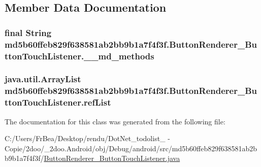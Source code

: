 \subsection{Member Data Documentation}
\hypertarget{classmd5b60ffeb829f638581ab2bb9b1a7f4f3f_1_1_button_renderer___button_touch_listener_fd5f3e04e3609dcb075193a11013bec6}{
\subsubsection[{\_\-\_\-md\_\-methods}]{\setlength{\rightskip}{0pt plus 5cm}final String {\bf md5b60ffeb829f638581ab2bb9b1a7f4f3f.ButtonRenderer\_\-ButtonTouchListener.\_\-\_\-md\_\-methods}}}
\label{classmd5b60ffeb829f638581ab2bb9b1a7f4f3f_1_1_button_renderer___button_touch_listener_fd5f3e04e3609dcb075193a11013bec6}


\hypertarget{classmd5b60ffeb829f638581ab2bb9b1a7f4f3f_1_1_button_renderer___button_touch_listener_84ecbd0189aa8fa49c03393cf6f9be5a}{
\subsubsection[{refList}]{\setlength{\rightskip}{0pt plus 5cm}java.util.ArrayList {\bf md5b60ffeb829f638581ab2bb9b1a7f4f3f.ButtonRenderer\_\-ButtonTouchListener.refList}}}
\label{classmd5b60ffeb829f638581ab2bb9b1a7f4f3f_1_1_button_renderer___button_touch_listener_84ecbd0189aa8fa49c03393cf6f9be5a}




The documentation for this class was generated from the following file:\begin{CompactItemize}
\item 
C:/Users/FrBea/Desktop/rendu/DotNet\_\-todolist\_ - Copie/2doo/\_\-2doo.Android/obj/Debug/android/src/md5b60ffeb829f638581ab2bb9b1a7f4f3f/\hyperlink{md5b60ffeb829f638581ab2bb9b1a7f4f3f_2_button_renderer___button_touch_listener_8java}{ButtonRenderer\_\-ButtonTouchListener.java}\end{CompactItemize}
